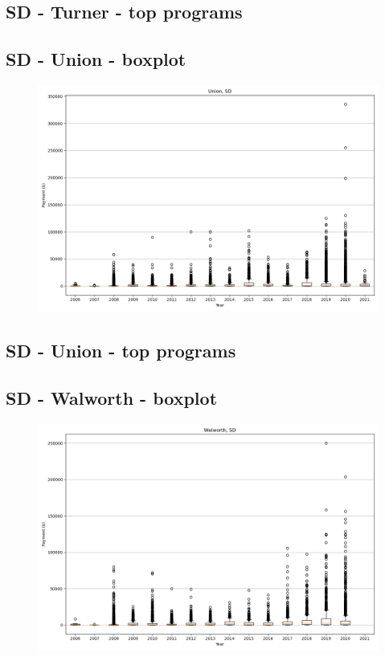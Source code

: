 \subsection*{SD - Turner - top programs}

\newpage
\subsection*{SD - Union - boxplot}
\begin{figure}[h]
\centering
\includegraphics[width=7in]{../output/boxplots/counties/Union-SD_boxplot.png}
\end{figure}


\subsection*{SD - Union - top programs}

\newpage
\subsection*{SD - Walworth - boxplot}
\begin{figure}[h]
\centering
\includegraphics[width=7in]{../output/boxplots/counties/Walworth-SD_boxplot.png}
\end{figure}


